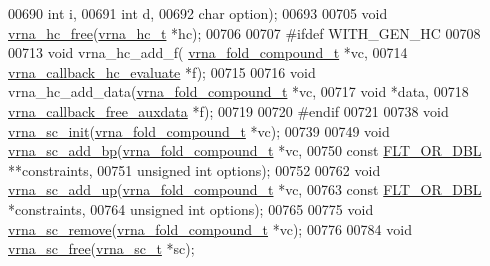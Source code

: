 \begin{DoxyCode}
00690                                 \textcolor{keywordtype}{int} i,
00691                                 \textcolor{keywordtype}{int} d,
00692                                 \textcolor{keywordtype}{char} option);
00693 
00705 \textcolor{keywordtype}{void} \hyperlink{group__hard__constraints_ga696dcf77887d856c6f21ea266d8b9ca2}{vrna\_hc\_free}(\hyperlink{group__hard__constraints_structvrna__hc__s}{vrna\_hc\_t} *hc);
00706 
00707 \textcolor{preprocessor}{#ifdef WITH\_GEN\_HC}
00708 
00713 \textcolor{keywordtype}{void} vrna\_hc\_add\_f( \hyperlink{group__fold__compound_structvrna__fc__s}{vrna\_fold\_compound\_t} *vc,
00714                     \hyperlink{group__hard__constraints_gabe10e2b9d2498874bdfe0e0a4dffc246}{vrna\_callback\_hc\_evaluate} *f);
00715 
00716 \textcolor{keywordtype}{void} vrna\_hc\_add\_data(\hyperlink{group__fold__compound_structvrna__fc__s}{vrna\_fold\_compound\_t} *vc,
00717                       \textcolor{keywordtype}{void} *data,
00718                       \hyperlink{group__fold__compound_ga75aaf7b809290de808e545877a9e20f7}{vrna\_callback\_free\_auxdata} *f);
00719 
00720 \textcolor{preprocessor}{#endif}
00721 
00738 \textcolor{keywordtype}{void} \hyperlink{group__soft__constraints_ga9d977a1681356778cc66dceafbe5b032}{vrna\_sc\_init}(\hyperlink{group__fold__compound_structvrna__fc__s}{vrna\_fold\_compound\_t} *vc);
00739 
00749 \textcolor{keywordtype}{void} \hyperlink{group__soft__constraints_ga86049d4bb0ea8674cae9b6177156b184}{vrna\_sc\_add\_bp}(\hyperlink{group__fold__compound_structvrna__fc__s}{vrna\_fold\_compound\_t} *vc,
00750                     \textcolor{keyword}{const} \hyperlink{group__data__structures_ga31125aeace516926bf7f251f759b6126}{FLT\_OR\_DBL} **constraints,
00751                     \textcolor{keywordtype}{unsigned} \textcolor{keywordtype}{int} options);
00752 
00762 \textcolor{keywordtype}{void} \hyperlink{group__soft__constraints_ga30f30c8eff9676775a3e831d972b5284}{vrna\_sc\_add\_up}(\hyperlink{group__fold__compound_structvrna__fc__s}{vrna\_fold\_compound\_t} *vc,
00763                     \textcolor{keyword}{const} \hyperlink{group__data__structures_ga31125aeace516926bf7f251f759b6126}{FLT\_OR\_DBL} *constraints,
00764                     \textcolor{keywordtype}{unsigned} \textcolor{keywordtype}{int} options);
00765 
00775 \textcolor{keywordtype}{void} \hyperlink{group__soft__constraints_ga73cdc07b9a199c614367bebef0f2c41a}{vrna\_sc\_remove}(\hyperlink{group__fold__compound_structvrna__fc__s}{vrna\_fold\_compound\_t} *vc);
00776 
00784 \textcolor{keywordtype}{void} \hyperlink{group__soft__constraints_ga6d55446448d69346fc313b993c4fb3e8}{vrna\_sc\_free}(\hyperlink{group__soft__constraints_structvrna__sc__s}{vrna\_sc\_t} *sc);

\end{DoxyCode}
